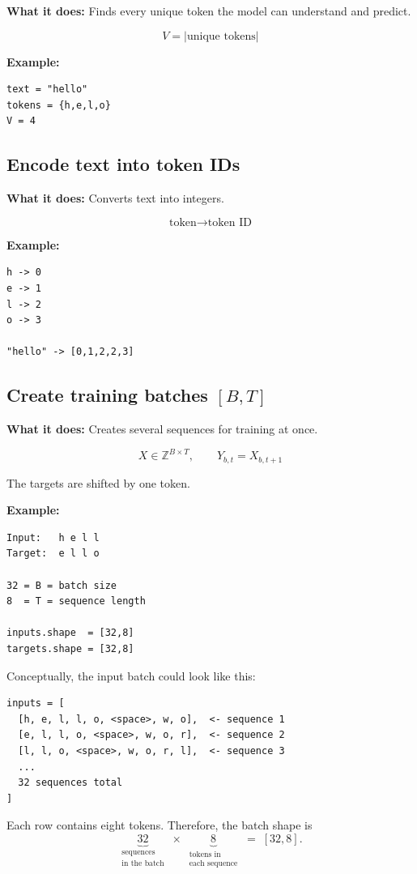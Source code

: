 \textbf{What it does:} Finds every unique token the model can understand and
predict.

\[
  V = \lvert\text{unique tokens}\rvert
\]

\textbf{Example:}
\begin{verbatim}
text = "hello"
tokens = {h,e,l,o}
V = 4
\end{verbatim}

\subsection{Encode text into token IDs}

\textbf{What it does:} Converts text into integers.

\[
  \text{token} \longrightarrow \text{token ID}
\]

\textbf{Example:}
\begin{verbatim}
h -> 0
e -> 1
l -> 2
o -> 3

"hello" -> [0,1,2,2,3]
\end{verbatim}

\subsection{Create training batches \( [B,T] \)}

\textbf{What it does:} Creates several sequences for training at once.

\[
  X \in \mathbb{Z}^{B\times T},
  \qquad
  Y_{b,t} = X_{b,t+1}
\]

The targets are shifted by one token. \\

\break

\textbf{Example:}
\begin{verbatim}
Input:   h e l l
Target:  e l l o

32 = B = batch size
8  = T = sequence length

inputs.shape  = [32,8]
targets.shape = [32,8]
\end{verbatim}

Conceptually, the input batch could look like this:
\begin{verbatim}
inputs = [
  [h, e, l, l, o, <space>, w, o],  <- sequence 1
  [e, l, l, o, <space>, w, o, r],  <- sequence 2
  [l, l, o, <space>, w, o, r, l],  <- sequence 3
  ...
  32 sequences total
]
\end{verbatim}

Each row contains eight tokens. Therefore, the batch shape is
\[
  \underbrace{32}_{\substack{\text{sequences}\\\text{in the batch}}}
  \;\times\;
  \underbrace{8}_{\substack{\text{tokens in}\\\text{each sequence}}}
  \;=\;[32,8].
\]

